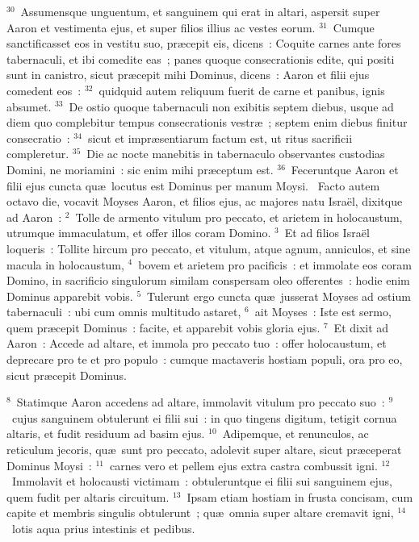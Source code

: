${}^{30}$~Assumensque unguentum, et sanguinem qui erat in altari, aspersit super Aaron et vestimenta ejus, et super filios illius ac vestes eorum.
${}^{31}$~Cumque sanctificasset eos in vestitu suo, pr\ae cepit eis, dicens~: Coquite carnes ante fores tabernaculi, et ibi comedite eas~; panes quoque consecrationis edite, qui positi sunt in canistro, sicut pr\ae cepit mihi Dominus, dicens~: Aaron et filii ejus comedent eos~:
${}^{32}$~quidquid autem reliquum fuerit de carne et panibus, ignis absumet.
${}^{33}$~De ostio quoque tabernaculi non exibitis septem diebus, usque ad diem quo complebitur tempus consecrationis vestr\ae~; septem enim diebus finitur consecratio~:
${}^{34}$~sicut et impr\ae sentiarum factum est, ut ritus sacrificii compleretur.
${}^{35}$~Die ac nocte manebitis in tabernaculo observantes custodias Domini, ne moriamini~: sic enim mihi pr\ae ceptum est.
${}^{36}$~Feceruntque Aaron et filii ejus cuncta qu\ae\ locutus est Dominus per manum Moysi.
~\lettrine[lines=10,image=true,loversize=0.05,lraise=-0.03]{F}{}acto autem octavo die, vocavit Moyses Aaron, et filios ejus, ac majores natu Isra\"el, dixitque ad Aaron~:
${}^{2}$~Tolle de armento vitulum pro peccato, et arietem in holocaustum, utrumque immaculatum, et offer illos coram Domino.
${}^{3}$~Et ad filios Isra\"el loqueris~: Tollite hircum pro peccato, et vitulum, atque agnum, anniculos, et sine macula in holocaustum,
${}^{4}$~bovem et arietem pro pacificis~: et immolate eos coram Domino, in sacrificio singulorum similam conspersam oleo offerentes~: hodie enim Dominus apparebit vobis.
${}^{5}$~Tulerunt ergo cuncta qu\ae\ jusserat Moyses ad ostium tabernaculi~: ubi cum omnis multitudo astaret,
${}^{6}$~ait Moyses~: Iste est sermo, quem pr\ae cepit Dominus~: facite, et apparebit vobis gloria ejus.
${}^{7}$~Et dixit ad Aaron~: Accede ad altare, et immola pro peccato tuo~: offer holocaustum, et deprecare pro te et pro populo~: cumque mactaveris hostiam populi, ora pro eo, sicut pr\ae cepit Dominus.


${}^{8}$~Statimque Aaron accedens ad altare, immolavit vitulum pro peccato suo~:
${}^{9}$~cujus sanguinem obtulerunt ei filii sui~: in quo tingens digitum, tetigit cornua altaris, et fudit residuum ad basim ejus.
${}^{10}$~Adipemque, et renunculos, ac reticulum jecoris, qu\ae\ sunt pro peccato, adolevit super altare, sicut pr\ae ceperat Dominus Moysi~:
${}^{11}$~carnes vero et pellem ejus extra castra combussit igni.
${}^{12}$~Immolavit et holocausti victimam~: obtuleruntque ei filii sui sanguinem ejus, quem fudit per altaris circuitum.
${}^{13}$~Ipsam etiam hostiam in frusta concisam, cum capite et membris singulis obtulerunt~; qu\ae\ omnia super altare cremavit igni,
${}^{14}$~lotis aqua prius intestinis et pedibus.


